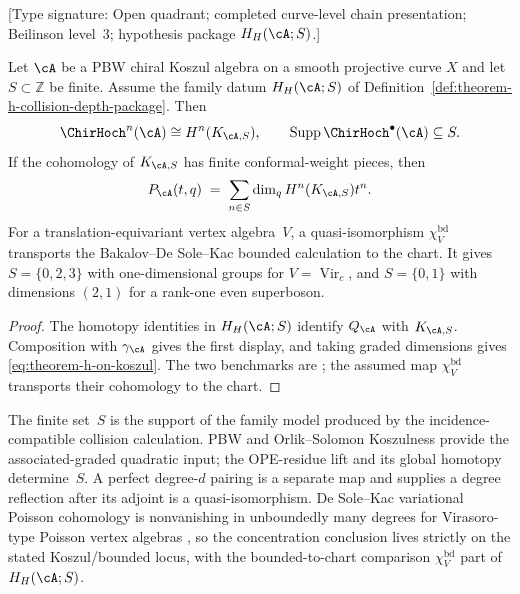 \begin{theorem}
\label{thm:theorem-h-on-koszul-locus}
\textup{[Type signature: Open quadrant; completed curve-level chain
presentation; Beilinson level~$3$; hypothesis package
$H_H(\cA;S)$.]}

Let $\cA$ be a PBW chiral Koszul algebra on a smooth projective curve
$X$ and let $S\subset\mathbb Z$ be finite.  Assume the family datum
$H_H(\cA;S)$ of
Definition~\ref{def:theorem-h-collision-depth-package}.  Then
\[
 \ChirHoch^n(\cA)\cong H^n(K_{\cA,S}),
 \qquad
 \operatorname{Supp}\ChirHoch^\bullet(\cA)\subseteq S.
\]
If the cohomology of $K_{\cA,S}$ has finite conformal-weight pieces,
then
\begin{equation}
\label{eq:theorem-h-on-koszul}
 P_{\cA}(t,q)
 \;=\;
 \sum_{n\in S}\dim_q H^n(K_{\cA,S})t^n.
\end{equation}
For a translation-equivariant vertex algebra~$V$, a
quasi-isomorphism $\chi_V^{\mathrm{bd}}$ transports the
Bakalov--De Sole--Kac bounded calculation to the chart.  It gives
$S=\{0,2,3\}$ with one-dimensional groups for
$V=\operatorname{Vir}_c$, and $S=\{0,1\}$ with dimensions $(2,1)$
for a rank-one even superboson.
\end{theorem}

\begin{proof}
The homotopy identities in $H_H(\cA;S)$ identify $Q_\cA$ with
$K_{\cA,S}$.  Composition with $\gamma_\cA$ gives the first
display, and taking graded dimensions gives
\eqref{eq:theorem-h-on-koszul}.  The two benchmarks are
\cite[Theorems~7.2 and~7.4]{BDSK21}; the assumed map
$\chi_V^{\mathrm{bd}}$ transports their cohomology to the chart.
\end{proof}

\begin{remark}
\label{rem:three-columns-verdier}
The finite set~$S$ is the support of the family model produced by the
incidence-compatible collision calculation.  PBW and
Orlik--Solomon Koszulness provide the associated-graded quadratic
input; the OPE-residue lift and its global homotopy determine~$S$.
A perfect degree-$d$ pairing is a separate map and supplies a degree
reflection after its adjoint is a quasi-isomorphism.
De Sole--Kac variational Poisson cohomology is nonvanishing in
unboundedly many degrees for Virasoro-type Poisson vertex algebras
\cite{BDSK21}, so the concentration conclusion lives strictly on the
stated Koszul/bounded locus, with the bounded-to-chart comparison
$\chi_V^{\mathrm{bd}}$ part of $H_H(\cA;S)$.
\end{remark}

